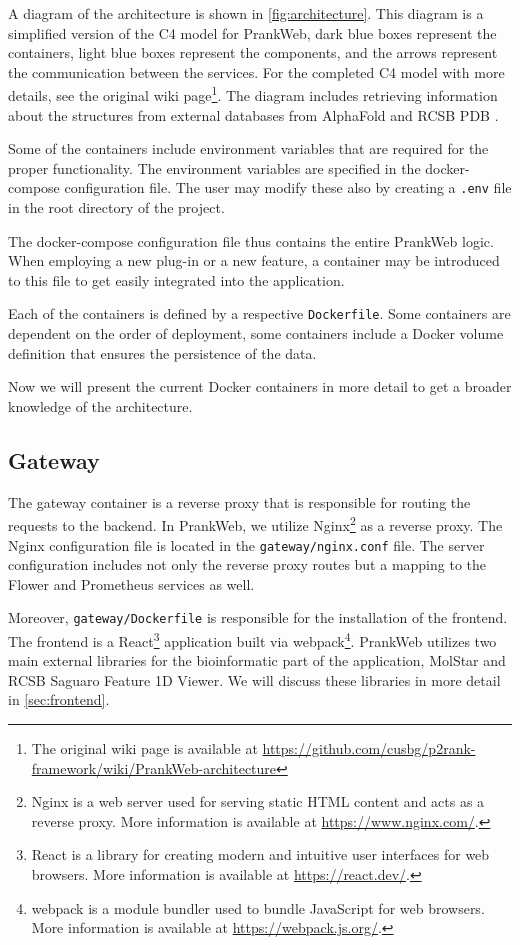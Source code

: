 A diagram of the architecture is shown in \cref{fig:architecture}. This diagram is a simplified version of the C4 model \cite{vazquez2020c4} for PrankWeb, dark blue boxes represent the containers, light blue boxes represent the components, and the arrows represent the communication between the services. For the completed C4 model with more details, see the original wiki page\footnote{The original wiki page is available at \url{https://github.com/cusbg/p2rank-framework/wiki/PrankWeb-architecture}}. The diagram includes retrieving information about the structures from external databases from AlphaFold \cite{david2022alphafold} and RCSB PDB \cite{kouranov2006rcsb}.

Some of the containers include environment variables that are required for the proper functionality. The environment variables are specified in the docker-compose configuration file. The user may modify these also by creating a \texttt{.env} file in the root directory of the project.

The docker-compose configuration file thus contains the entire PrankWeb logic. When employing a new plug-in or a new feature, a container may be introduced to this file to get easily integrated into the application.

Each of the containers is defined by a respective \texttt{Dockerfile}. Some containers are dependent on the order of deployment, some containers include a Docker volume definition that ensures the persistence of the data.

Now we will present the current Docker containers in more detail to get a broader knowledge of the architecture.

\subsection{Gateway}
\label{subsec:gateway}

The gateway container is a reverse proxy that is responsible for routing the requests to the backend. In PrankWeb, we utilize Nginx\footnote{Nginx is a web server used for serving static HTML content and acts as a reverse proxy. More information is available at \url{https://www.nginx.com/}.} as a reverse proxy. The Nginx configuration file is located in the \texttt{gateway/nginx.conf} file. The server configuration includes not only the reverse proxy routes but a mapping to the Flower and Prometheus services as well.

Moreover, \texttt{gateway/Dockerfile} is responsible for the installation of the frontend. The frontend is a React\footnote{React is a library for creating modern and intuitive user interfaces for web browsers. More information is available at \url{https://react.dev/}.} application built via webpack\footnote{webpack is a module bundler used to bundle JavaScript for web browsers. More information is available at \url{https://webpack.js.org/}.}. PrankWeb utilizes two main external libraries for the bioinformatic part of the application, MolStar and RCSB Saguaro Feature 1D Viewer. We will discuss these libraries in more detail in \cref{sec:frontend}.

